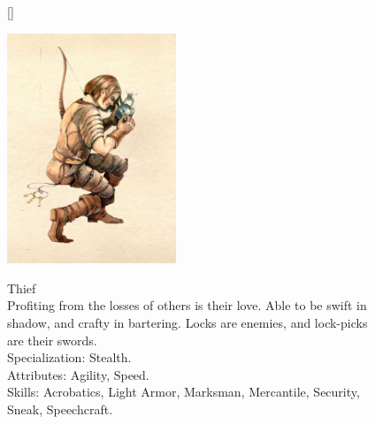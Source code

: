 \documentclass[12pt]{book}
\begin{document}
\begin{figure}[H]
[\FBwidth]
{\caption*{Thief\\

Profiting from the losses of others is their love. Able to be swift in shadow, and crafty in bartering. Locks are enemies, and lock-picks are their swords.\\

Specialization: Stealth.\\

Attributes: Agility, Speed.\\

Skills: Acrobatics, Light Armor, Marksman, Mercantile, Security, Sneak, Speechcraft.}\label{fig:test}}
{\includegraphics[width=0.45\textwidth]{Thiefclass.png}}
\end{figure}
\end{document}
